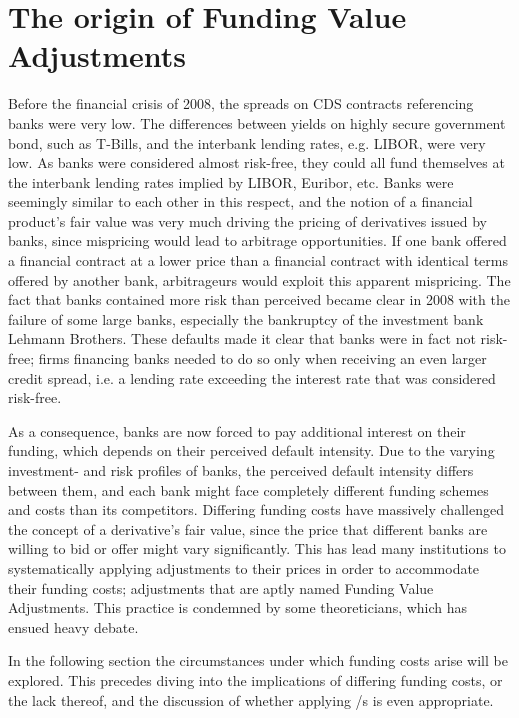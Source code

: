 \documentclass[main.tex]{subfiles}
\begin{document}
    \section{The origin of Funding Value Adjustments}
        Before the financial crisis of 2008, the spreads on CDS contracts referencing banks were very low.
        The differences between yields on highly secure government bond, such as T-Bills,
        and the interbank lending rates, e.g. LIBOR, were very low.
        As banks were considered almost risk-free, 
        they could all fund themselves at the interbank lending rates implied by LIBOR, Euribor, etc.
        Banks were seemingly similar to each other in this respect, 
        and the notion of a financial product's fair value was very much driving the pricing of derivatives issued by banks,
        since mispricing would lead to arbitrage opportunities.
        If one bank offered a financial contract at a lower price than a financial contract with identical terms
        offered by another bank, arbitrageurs would exploit this apparent mispricing. 
        The fact that banks contained more risk than perceived became clear in 2008
        with the failure of some large banks, 
        especially the bankruptcy of the investment bank Lehmann Brothers.
        These defaults made it clear that banks were in fact not risk-free; 
        firms financing banks needed to do so only when receiving an even larger credit spread,
        i.e. a lending rate exceeding the interest rate that was considered risk-free. 
        
        As a consequence, banks are now forced to pay additional interest on their funding, 
        which depends on their perceived default intensity.
        Due to the varying investment- and risk profiles of banks, 
        the perceived default intensity differs between them, 
        and each bank might face completely different funding schemes and costs than its competitors.
        Differing funding costs have massively challenged the concept of a derivative's fair value,
        since the price that different banks are willing to bid or offer might vary significantly. 
        This has lead many institutions to systematically applying adjustments to their prices
        in order to accommodate their funding costs; 
        adjustments that are aptly named Funding Value Adjustments. 
        This practice is condemned by some theoreticians, 
        which has ensued heavy debate.
        
        In the following section the circumstances under which funding costs arise will be explored.
        This precedes diving into the implications of differing funding costs, or the lack thereof,
        and the discussion of whether applying \FVA/s is even appropriate.
\end{document}
